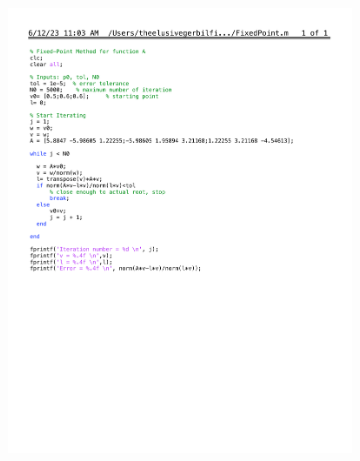 \documentclass[12pt]{article}
\begin{document}
\begin{enumerate}[label=\bfseries Problem \arabic*:]
\begin{itemize}
\begin{figure}[h!]
\begin{subfigure}{.5\textwidth}
               \includegraphics[width=\linewidth]{Fixed_point_final.pdf}
            \end{subfigure}%
            \begin{subfigure}{.5\textwidth}
                \centering

\end{subfigure}
\end{figure}
\end{itemize}
\end{enumerate}
\end{document}

